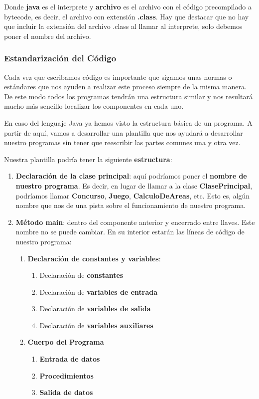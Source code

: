 Donde \textbf{java} es el interprete y \textbf{archivo} es el archivo con el código precompilado a bytecode, es decir, el archivo con extensión \textbf{.class}. Hay que destacar que no hay que incluir la extensión del archivo .class al llamar al interprete, solo debemos poner el nombre del archivo.

\subsubsection{Estandarización del Código}
Cada vez que escribamos código es importante que sigamos unas normas o estándares que nos ayuden a realizar este proceso siempre de la misma manera. De este modo todos los programas tendrán una estructura similar y nos resultará mucho más sencillo localizar los componentes en cada uno.

En caso del lenguaje Java ya hemos visto la estructura básica de un programa. A partir de aquí, vamos a desarrollar una plantilla que nos ayudará a desarrollar nuestro programas sin tener que reescribir las partes comunes una y otra vez.

Nuestra plantilla podría tener la siguiente \textbf{estructura}:

\begin{enumerate}
    \item \textbf{Declaración de la clase principal}: aquí podríamos poner el \textbf{nombre de nuestro programa}. Es decir, en lugar de llamar a la clase \textbf{ClasePrincipal}, podríamos llamar \textbf{Concurso}, \textbf{Juego}, \textbf{CalculoDeAreas}, etc. Esto es, algún nombre que nos de una pista sobre el funcionamiento de nuestro programa.

    \item \textbf{Método main}: dentro del componente anterior y encerrado entre llaves. Este nombre no se puede cambiar. En su interior estarán las líneas de código de nuestro programa:

    \begin{enumerate}
        \item \textbf{Declaración de constantes y variables}:
        \begin{enumerate}
            \item Declaración de \textbf{constantes}
            \item Declaración de \textbf{variables de entrada}
            \item Declaración de \textbf{variables de salida}
            \item Declaración de \textbf{variables auxiliares}
        \end{enumerate}
        \item \textbf{Cuerpo del Programa}
        \begin{enumerate}
            \item \textbf{Entrada de datos}
            \item \textbf{Procedimientos}
            \item \textbf{Salida de datos}
        \end{enumerate}
    \end{enumerate}
\end{enumerate}

